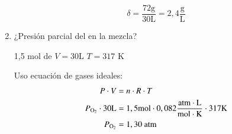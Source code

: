\begin{enumerate}[left=0cm]
$$\delta = \dfrac{72 \text{g}}{30 \text{L}} = 2,4 \dfrac{\text{g}}{\text{L}}$$


\item ¿Presión parcial del  en la mezcla?

\hfil
1,5 mol de 
\hfil
$V = 30$L 
\hfil
$T=317$ K
\hfil

Uso ecuación de gases ideales:
\begin{align*}
    P\cdot V &= n \cdot R \cdot T\\
    P_{\ce{O2}} \cdot 30 \text{L} &= 1,5\text{mol} \cdot 0,082\dfrac{\text{atm}\cdot \text{L}}{\text{mol}\cdot\text{K}}  \cdot 317 \text{K}\\
    P_{\ce{O2}} &= 1,30 \text{ atm}
\end{align*}

\end{enumerate}
